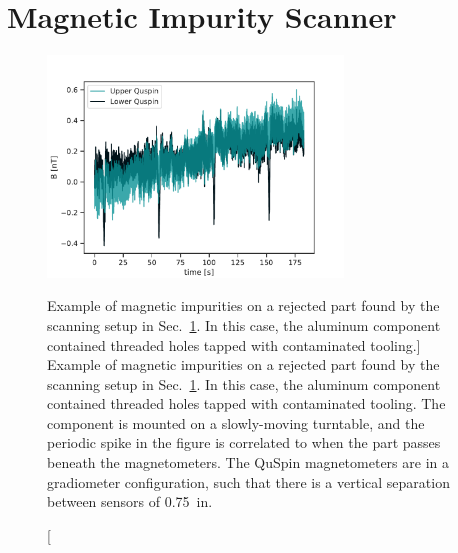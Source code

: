 
\section{Magnetic Impurity Scanner}\label{sec:magnetic_impurity_scanner}


\begin{figure}
    \centering
    \includegraphics[width=0.7\textwidth]{figures/magnetic_contamination_example.pdf}
    \caption
    [Example of magnetic impurities on a rejected part found by the scanning setup in Sec.~\ref{sec:magnetic_impurity_scanner}. In this case, the aluminum  component contained threaded holes tapped with contaminated tooling.]
      {Example of magnetic impurities on a rejected part found by the scanning setup in Sec.~\ref{sec:magnetic_impurity_scanner}. In this case, the aluminum  component contained threaded holes tapped with contaminated tooling. The component is mounted on a slowly-moving turntable, and the periodic spike in the figure is correlated to when the part passes beneath the magnetometers. The QuSpin magnetometers are in a gradiometer configuration, such that there is a vertical separation between sensors of \qty{0.75}{in}.}
    \label{fig:magnetic_contamination_example}
\end{figure}


